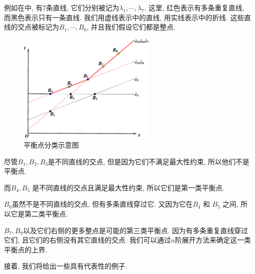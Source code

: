 例如在中, 有7条直线, 它们分别被记为$\lambda_1,\cdots,\lambda_7$. 这里, 红色表示有多条重复直线, 而黑色表示只有一条直线. 我们用虚线表示中的直线, 用实线表示中的折线. 这些直线的交点被标记为$B_1,\cdots,B_8$, 并且我们假设它们都是整点. 
\begin{figure}[H]
\centering
\includegraphics[width=0.6\textwidth]{fig/ps.eps}
\caption{平衡点分类示意图}
\label{point}
\end{figure}
\begin{compactitem}[\textbullet]
\item 尽管$B_1,B_2,B_3$是不同直线的交点, 但是因为它们不满足最大性约束, 所以他们不是平衡点. 
\item 而$B_4,B_5$ 是不同直线的交点且满足最大性约束, 所以它们是第一类平衡点.
\item $B_6$虽然不是不同直线的交点, 但有多条直线穿过它. 又因为它在$B_4$ 和 $B_5$ 之间, 所以它是第二类平衡点.
\item $B_7,B_8$以及它们右侧的更多整点是可能的第三类平衡点\BPthree{}. 因为有多条重复直线穿过它们, 且它们的右侧没有其它直线的交点. 我们可以通过$n$阶展开方法来确定这一类平衡点的上界.
\end{compactitem}

接着, 我们将给出一些具有代表性的例子. 

